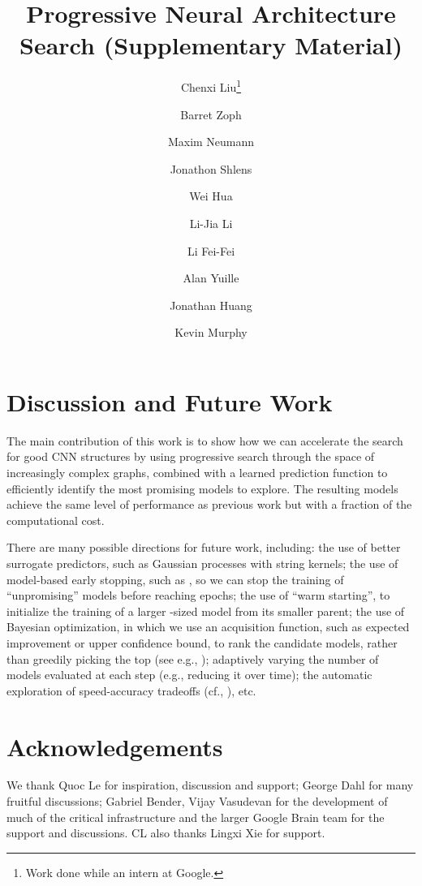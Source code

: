\documentclass[runningheads]{llncs}
\begin{document}
\section{Discussion and Future Work}
\label{sec:discuss}

The main contribution of this work is to show how we can accelerate the search for good CNN structures by using progressive search through the space of increasingly complex graphs, combined with a learned prediction function to efficiently identify the most promising models to explore.
The resulting models achieve the same level of performance as previous work but with a fraction of the computational cost.



There are many possible directions for future work,
including:
the use of better surrogate predictors,
such as Gaussian processes with string kernels;
the use of model-based early stopping,
such as 
\cite{Baker2017acc},
so we can stop the training of ``unpromising'' models before reaching  epochs;
the use of ``warm starting'', to initialize the training of a larger -sized model
 from its smaller parent;
 the use of Bayesian optimization,
in which we use an acquisition function,
such as expected improvement or upper confidence bound,
to rank the candidate models, rather than greedily picking the top 
(see e.g., \cite{Snoek2012,Shahriari2016});
adaptively varying the number of models  evaluated at each step (e.g., reducing it over time);
the automatic exploration of speed-accuracy tradeoffs (cf., \cite{PPPnet}),
etc.



 
\clearpage
\section*{Acknowledgements}
We thank Quoc Le for inspiration, discussion and support; George Dahl for many fruitful discussions; Gabriel Bender, Vijay Vasudevan for the development of much of the critical infrastructure and the larger Google Brain team for the support and discussions. CL also thanks Lingxi Xie for support.






\clearpage
\title{Progressive Neural Architecture Search (Supplementary Material)} 



\author{Chenxi Liu\thanks{Work done while an intern at Google.} \and
Barret Zoph \and
Maxim Neumann \and
Jonathon Shlens \and
Wei Hua \and 
Li-Jia Li \and 
Li Fei-Fei \and 
Alan Yuille \and 
Jonathan Huang \and 
Kevin Murphy
}
\end{document}
